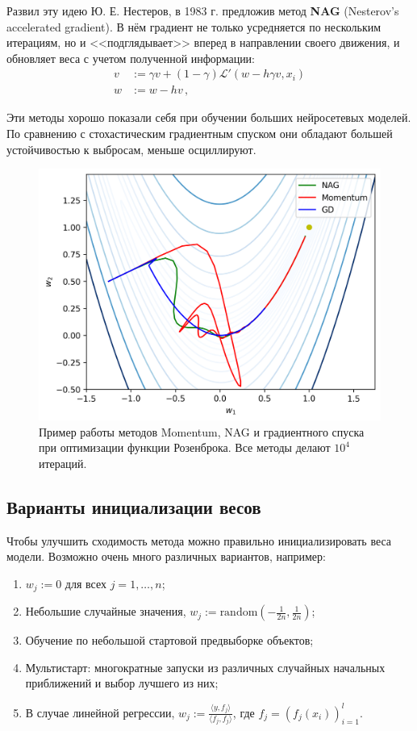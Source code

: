 Развил эту идею Ю. Е. Нестеров, в 1983 г. предложив метод \textbf{NAG} (Nesterov's accelerated gradient). В нём градиент не только усредняется по нескольким итерациям, но и <<подглядывает>> вперед в направлении своего движения, и обновляет веса с учетом полученной информации:
\begin{align*}
v &:= \gamma v + (1 - \gamma) \mathcal{L}'(w - h \gamma v, x_i) \\
w &:= w - h v\,,
\end{align*}

Эти методы хорошо показали себя при обучении больших нейросетевых моделей. По сравнению с стохастическим градиентным спуском они обладают большей устойчивостью к выбросам, меньше осциллируют.

\begin{figure}[h]
	\centering
	\includegraphics[width=0.6\linewidth]{chapters/neural/images/nag_momentum_gd.png}
	\caption{Пример работы методов Momentum, NAG и градиентного спуска при оптимизации функции Розенброка. Все методы делают $10^4$ итераций.}
	\label{img:gd_osc}
\end{figure}

\subsection{Варианты инициализации весов}

Чтобы улучшить сходимость метода можно правильно инициализировать веса модели. Возможно очень много различных вариантов, например:
\begin{enumerate}
    \item $w_j := 0$ для всех $j=1,\dots,n$;
    \item Небольшие случайные значения, $w_j := \text{random}\left(-\frac{1}{2n}, \frac{1}{2n}\right)$;
    \item Обучение по небольшой стартовой предвыборке объектов;
    \item Мультистарт: многократные запуски из различных случайных начальных приближений и выбор лучшего из них;
    \item В случае линейной регрессии, $w_j := \frac{\langle y, f_j \rangle}{\langle f_j, f_j \rangle}$, где $f_j = (f_j(x_i))_{i=1}^l$.
\end{enumerate}

